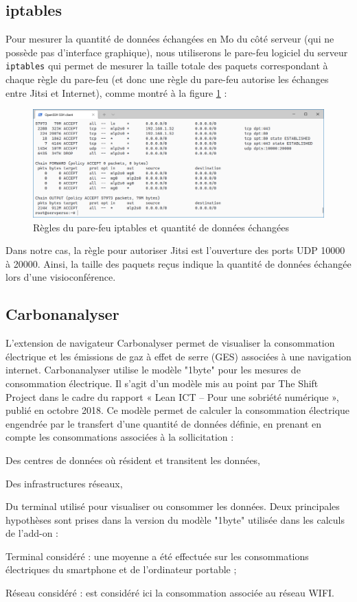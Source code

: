 \documentclass[11pt,a4paper]{report}
\begin{document}
\subsection{iptables}
Pour mesurer la quantité de données échangées en Mo du côté serveur (qui ne possède pas d'interface graphique), nous utiliserons le pare-feu logiciel du serveur \texttt{iptables} qui permet de mesurer la taille totale des paquets correspondant à chaque règle du pare-feu (et donc une règle du pare-feu autorise les échanges entre Jitsi et Internet), comme montré à la figure \ref{fig:iptables} :
\begin{figure}[!h]
    \centering
    \includegraphics[scale=0.5]{iptables.PNG}
    \caption{Règles du pare-feu iptables et quantité de données échangées}
    \label{fig:iptables}
\end{figure}

Dans notre cas, la règle pour autoriser Jitsi est l'ouverture des ports UDP 10000 à 20000. Ainsi, la taille des paquets reçus indique la quantité de données échangée lors d'une visioconférence.

\subsection{Carbonanalyser}
L’extension de navigateur Carbonalyser permet de visualiser la consommation électrique et les émissions de gaz à effet de serre (GES) associées à une navigation internet.
Carbonanalyser utilise le modèle "1byte" pour les mesures de consommation électrique. Il s'agit d'un modèle mis au point par The Shift Project dans le cadre du rapport « Lean ICT – Pour une sobriété numérique », publié en octobre 2018. Ce modèle permet de calculer la consommation électrique engendrée par le transfert d’une quantité de données définie, en prenant en compte les consommations associées à la sollicitation :
\bi \item Des centres de données où résident et transitent les données,
\item Des infrastructures réseaux,
\item Du terminal utilisé pour visualiser ou consommer les données. \ei
Deux principales hypothèses sont prises dans la version du modèle "1byte" utilisée dans les calculs de l’add-on :
\bi \item Terminal considéré : une moyenne a été effectuée sur les consommations électriques du smartphone et de l’ordinateur portable ;
\item Réseau considéré : est considéré ici la consommation associée au réseau WIFI.  \ei
\end{document}
